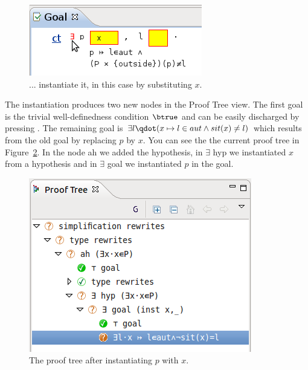 \begin{figure}[!ht]
\begin{center}
	\includegraphics{img/tutorial/tut_10_instantiate_p.png}
	\caption{... instantiate it, in this case by substituting $x$.}
	\label{fig_tut_10_instantiate_p}
\end{center}
\end{figure}


The instantiation produces two new nodes in the \textsf{Proof Tree} view. The first goal is the trivial well-definedness condition $\btrue$ and
  can be easily discharged by pressing .
The remaining goal is $\exists l\qdot (x \mapsto  l \in  aut \land  sit(x) \neq l)$ which results from the old goal by replacing $p$ by $x$.
You can see the the current proof tree in Figure~\ref{fig_tut_10_proof_tree}. In the node \textsf{ah} we added the hypothesis, in \textsf{$\exists$ hyp}
  we instantiated $x$ from a hypothesis and in \textsf{$\exists$ goal} we instantiated $p$ in the goal.

\begin{figure}[!ht]
\begin{center}
	\includegraphics{img/tutorial/tut_10_proof_tree.png}
	\caption{The proof tree after instantiating $p$ with $x$.}
	\label{fig_tut_10_proof_tree}
\end{center}
\end{figure}

